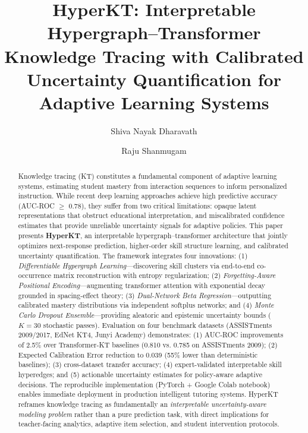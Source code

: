 \documentclass[preprint,12pt]{elsarticle}
\begin{document}
\begin{frontmatter}

\title{HyperKT: Interpretable Hypergraph--Transformer Knowledge Tracing with Calibrated Uncertainty Quantification for Adaptive Learning Systems}

\author[inst1]{Shiva Nayak Dharavath}

\author[inst1]{Raju Shanmugam}



\begin{abstract}
Knowledge tracing (KT) constitutes a fundamental component of adaptive learning systems, estimating student mastery from interaction sequences to inform personalized instruction. While recent deep learning approaches achieve high predictive accuracy (AUC-ROC $\geq$ 0.78), they suffer from two critical limitations: opaque latent representations that obstruct educational interpretation, and miscalibrated confidence estimates that provide unreliable uncertainty signals for adaptive policies. This paper presents \textbf{HyperKT}, an interpretable hypergraph--transformer architecture that jointly optimizes next-response prediction, higher-order skill structure learning, and calibrated uncertainty quantification. The framework integrates four innovations: (1) \textit{Differentiable Hypergraph Learning}—discovering skill clusters via end-to-end co-occurrence matrix reconstruction with entropy regularization; (2) \textit{Forgetting-Aware Positional Encoding}—augmenting transformer attention with exponential decay grounded in spacing-effect theory; (3) \textit{Dual-Network Beta Regression}—outputting calibrated mastery distributions via independent softplus networks; and (4) \textit{Monte Carlo Dropout Ensemble}—providing aleatoric and epistemic uncertainty bounds ($K=30$ stochastic passes). Evaluation on four benchmark datasets (ASSISTments 2009/2017, EdNet KT4, Junyi Academy) demonstrates: (1) AUC-ROC improvements of 2.5\% over Transformer-KT baselines (0.810 vs. 0.785 on ASSISTments 2009); (2) Expected Calibration Error reduction to 0.039 (55\% lower than deterministic baselines); (3) cross-dataset transfer accuracy; (4) expert-validated interpretable skill hyperedges; and (5) actionable uncertainty estimates for policy-aware adaptive decisions. The reproducible implementation (PyTorch + Google Colab notebook) enables immediate deployment in production intelligent tutoring systems. HyperKT reframes knowledge tracing as fundamentally an \textit{interpretable uncertainty-aware modeling problem} rather than a pure prediction task, with direct implications for teacher-facing analytics, adaptive item selection, and student intervention protocols.


\end{abstract}
\end{frontmatter}
\end{document}
